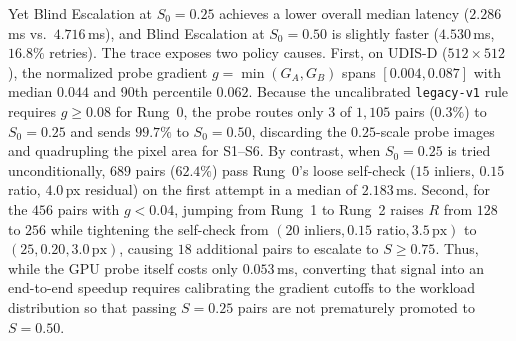 Yet Blind Escalation at $S_0=0.25$ achieves a lower overall median latency
($2.286$\,ms vs.\ $4.716$\,ms), and Blind Escalation at $S_0=0.50$ is slightly
faster ($4.530$\,ms, $16.8\%$ retries). The trace exposes two policy causes.
First, on UDIS-D ($512\times 512$), the normalized probe gradient
$g=\min(G_A,G_B)$ spans $[0.004, 0.087]$ with median $0.044$ and 90th percentile
$0.062$. Because the uncalibrated \texttt{legacy-v1} rule requires $g\ge 0.08$
for Rung~0, the probe routes only $3$ of $1{,}105$ pairs ($0.3\%$) to $S_0=0.25$
and sends $99.7\%$ to $S_0=0.50$, discarding the $0.25$-scale probe images and
quadrupling the pixel area for S1--S6. By contrast, when $S_0=0.25$ is tried
unconditionally, $689$ pairs ($62.4\%$) pass Rung~0's loose self-check
($15$ inliers, $0.15$ ratio, $4.0$\,px residual) on the first attempt in a
median of $2.183$\,ms. Second, for the $456$ pairs with $g<0.04$, jumping from
Rung~1 to Rung~2 raises $R$ from $128$ to $256$ while tightening the self-check
from $(20\text{ inliers}, 0.15\text{ ratio}, 3.5\,\text{px})$ to
$(25, 0.20, 3.0\,\text{px})$, causing $18$ additional pairs to escalate to
$S\ge 0.75$. Thus, while the GPU probe itself costs only $0.053$\,ms, converting
that signal into an end-to-end speedup requires calibrating the gradient cutoffs
to the workload distribution so that passing $S=0.25$ pairs are not prematurely
promoted to $S=0.50$.
